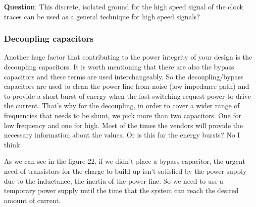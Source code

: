 \documentclass[12pt]{article}
\begin{document}
\textbf{Question}: This discrete, isolated ground for the high speed signal of the clock traces can be used as a general technique for high speed signals?

\subsubsection{Decoupling capacitors}

Another huge factor that contributing to the power integrity of your design is the decoupling capacitors. It is worth mentioning that there are also the bypass capacitors and these terms are used interchangeably. So the decoupling/bypass capacitors are used to clean the power line from noise (low impedance path) and to provide a short burst of energy when the fast switching request power to drive the current. That's why for the decoupling, in order to cover a wider range of frequencies that needs to be shunt, we pick more than two capacitors. One for low frequency and one for high. Most of the times the vendors will provide the necessary information about the values. Or is this for the energy bursts? No I think


As we can see in the figure 22, if we didn't place a bypass capacitor, the urgent need of transistors for the charge to build up isn't satisfied by the power supply due to the inductance, the inertia of the power line. So we need to use a temporary power supply until the time that the system can reach the desired amount of current. 
\end{document}
